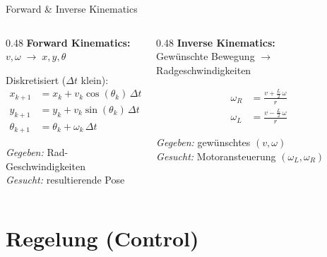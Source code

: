 \documentclass[%
  aspectratio=169,
  10pt
]{beamer}
\begin{document}
\begin{frame}{Forward \& Inverse Kinematics}

\begin{columns}[T]
  \begin{column}{0.48\textwidth}
    \textbf{Forward Kinematics:}\\
    $v, \omega \;\rightarrow\; x, y, \theta$

    \vspace{2mm}
    Diskretisiert ($\Delta t$ klein):
    \begin{align*}
      x_{k+1}      &= x_k + v_k \cos(\theta_k)\,\Delta t \\
      y_{k+1}      &= y_k + v_k \sin(\theta_k)\,\Delta t \\
      \theta_{k+1}  &= \theta_k + \omega_k\,\Delta t
    \end{align*}

    \emph{Gegeben:} Rad-Geschwindigkeiten\\
    \emph{Gesucht:} resultierende Pose
  \end{column}
  \begin{column}{0.48\textwidth}
    \textbf{Inverse Kinematics:}\\
    Gewünschte Bewegung $\rightarrow$ Radgeschwindigkeiten

    \vspace{2mm}
    \begin{align*}
      \omega_R &= \frac{v + \frac{L}{2}\,\omega}{r} \\[2mm]
      \omega_L &= \frac{v - \frac{L}{2}\,\omega}{r}
    \end{align*}

    \emph{Gegeben:} gewünschtes $(v, \omega)$\\
    \emph{Gesucht:} Motoransteuerung $(\omega_L, \omega_R)$
  \end{column}
\end{columns}

\end{frame}


\section{Regelung (Control)}
\end{document}
